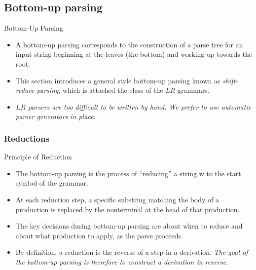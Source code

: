 \begin{bibunit}[apalike]
\subsection{Bottom-up parsing}

\tableofcontentslide[sectionstyle={show/shaded},subsectionstyle={show/shaded/hide},subsubsectionstyle={show/show/hide/hide}]

\begin{frame}{Bottom-Up Parsing}
	\begin{itemize}
	\item A bottom-up parsing corresponds to the construction of a parse tree for an input string beginning at the leaves (the bottom) and working up towards the root.
	\vfill
	\item This section introduces a general style bottom-up parsing known as \emph{shift-reduce parsing}, which is attached the class of the $LR$ grammars.
	\vfill
	\item \emph{$LR$ parsers are too difficult to be written by hand. We prefer to use automatic parser generators in place.}
	\end{itemize}
\end{frame}

\subsubsection{Reductions}

\tableofcontentslide[sectionstyle={show/shaded},subsectionstyle={show/shaded/hide},subsubsectionstyle={show/shaded/hide/hide}]

\begin{frame}{Principle of Reduction}
	\begin{itemize}
	\item The bottom-up parsing is the process of ``reducing'' a string w to the start symbol of the grammar.
	\vfill
	\item At each reduction step, a specific substring matching the body of a production is replaced by the nonterminal at the head of that production.
	\vfill
	\item The key decisions during bottom-up parsing are about when to reduce and about what production to apply, as the parse proceeds.
	\vfill
	\item By definition, a reduction is the reverse of a step in a derivation. \emph{The goal of the bottom-up parsing is therefore to construct a derivation in reverse.}
	\end{itemize}
\end{frame}


\end{bibunit}
